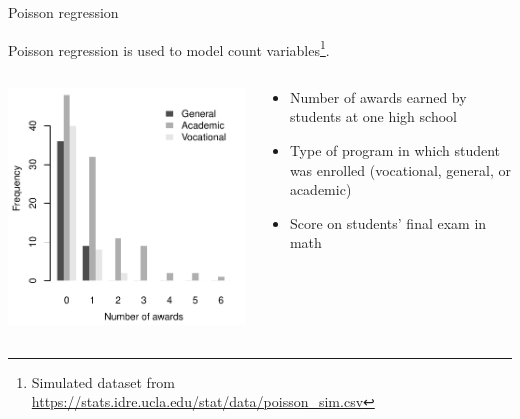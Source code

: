 \documentclass[aspectratio=169]{beamer}
\begin{document}
\begin{frame}{Poisson regression}

Poisson regression is used to model count variables\footnote{Simulated dataset from
  \url{https://stats.idre.ucla.edu/stat/data/poisson_sim.csv}}.\\[2ex]
\begin{columns}[c]
\begin{column}{6cm}
  \includegraphics[scale=.7]{../figures/pois_example}
\end{column}
\begin{column}{5cm}
  \begin{itemize}
    \item Number of awards earned by students at one high school
    \item Type of program in which student was enrolled (vocational,
    general, or academic)
    \item Score on students' final exam in math
  \end{itemize}
\end{column}
\end{columns}
\end{frame}
\end{document}
